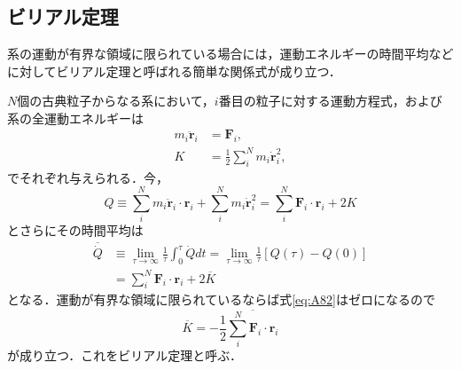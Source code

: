 \documentclass[main.tex]{subfiles}
\begin{document}
	\appendix
	\chapter{}
	\section{ビリアル定理}
	
	系の運動が有界な領域に限られている場合には，運動エネルギーの時間平均などに対してビリアル定理と呼ばれる簡単な関係式が成り立つ．
	
	$N$個の古典粒子からなる系において，$i$番目の粒子に対する運動方程式，および系の全運動エネルギーは
	\begin{align}
		m_i \ddot{\bm{r}}_i &= \bm{F}_i, \\
		K &= \frac{1}{2} \sum_{i}^{N} m_i \dot{\bm{r}}_i^2,
	\end{align}
	でそれぞれ与えられる．今，
	\begin{equation}
		Q \equiv \sum_{i}^{N} m_i \ddot{\bm{r}}_i \cdot \bm{r}_i + \sum_{i}^{N} m_i \dot{\bm{r}}_i^2 = \sum_{i}^{N} \bm{F}_i \cdot \bm{r}_i + 2K
	\end{equation}
	とさらにその時間平均は
	\begin{align}
		\overline{\dot{Q}} &\equiv \lim_{\tau \rightarrow \infty} \frac{1}{\tau} \int_0^\tau \dot{Q} dt = \lim_{\tau \rightarrow \infty} \frac{1}{\tau} [Q(\tau) - Q(0)] \label{eq:A82}\\
		&= \sum_{i}^{N} \bm{F}_i\cdot\bm{r}_i + 2 \overline{K}
	\end{align}
	となる．運動が有界な領域に限られているならば式\eqref{eq:A82}はゼロになるので
	\begin{equation}
		\overline{K} = -\frac{1}{2} \overline{\sum_{i}^{N} \bm{F}_i \cdot \bm{r}_i} \label{eq:A84}
	\end{equation}
	が成り立つ．これをビリアル定理と呼ぶ．
	
\end{document}
